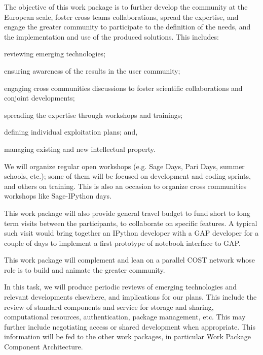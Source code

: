 \begin{workpackage}[id=dissem,wphases=18-48!.5,
  title=Dissemination and Community Building,
  lead=PS,
  PSRM=10, %
  SARM=18,
  USORM=10,
  USHRM=8,
  USRM=24,
  UVRM=2,
  UBRM=4,
]


\begin{wpobjectives}
  The objective of this work package is to further develop the community at the
  European scale, foster cross teams collaborations, spread the
  expertise, and engage the greater community to participate to the
  definition of the needs, and the implementation and use of the
  produced solutions. This includes:

  \begin{compactitem}
  \item reviewing emerging technologies;
  \item ensuring awareness of the results in the user community;
  \item engaging cross communities discussions to foster scientific collaborations and conjoint developments;
  \item spreading the expertise through workshops and trainings;
  \item defining individual exploitation plans; and,
  \item managing existing and new intellectual property.
  \end{compactitem}
\end{wpobjectives}

\begin{wpdescription} 
  We will organize regular open workshops (e.g. Sage Days, Pari Days,
  summer schools, etc.); some of them will be focused on development
  and coding sprints, and others on training. This is also an occasion
  to organize cross communities workshops like Sage-IPython days.


  This work package will also provide general travel budget to fund
  short to long term visits between the participants, to collaborate
  on specific features. A typical such visit would bring together an
  IPython developer with a GAP developer for a couple of days to
  implement a first prototype of notebook interface to GAP.

  This work package will complement and lean on a parallel COST
  network whose role is to build and animate the greater community.
\end{wpdescription}

\begin{tasklist}
\begin{task}[title=Reviewing emerging technologies]
  In this task, we will produce periodic reviews of emerging
  technologies and relevant developments elsewhere, and implications
  for our plans. This include the review of standard components and
  service for storage and sharing, computational resources,
  authentication, package management, etc. This may further include
  negotiating access or shared development when appropriate. This
  information will be fed to the other work packages, in particular
  Work Package~ Component Architecture.
\end{task}


\end{tasklist}
\end{workpackage}
